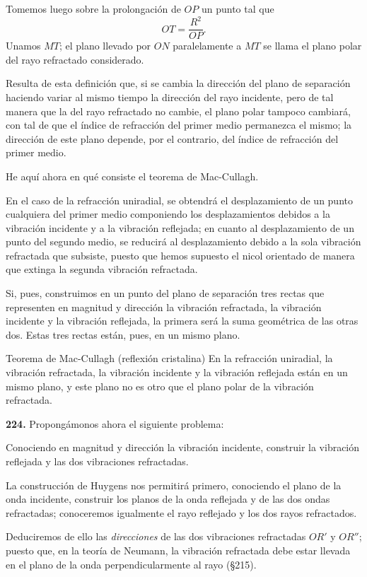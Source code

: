 Tomemos luego sobre la prolongación de $OP$ un punto tal que
\[
OT=\frac{R^2}{OP}.
\]
Unamos $MT$; el plano llevado por $ON$ paralelamente a $MT$ se llama el
plano polar del rayo refractado considerado.

Resulta de esta definición que, si se cambia la dirección del plano de
separación haciendo variar al mismo tiempo la dirección del rayo
incidente, pero de tal manera que la del rayo refractado no cambie, el
plano polar tampoco cambiará, con tal de que el índice de refracción del
primer medio permanezca el mismo; la dirección de este plano depende, por
el contrario, del índice de refracción del primer medio.

He aquí ahora en qué consiste el teorema de Mac-Cullagh.

En el caso de la refracción uniradial, se obtendrá el desplazamiento de
un punto cualquiera del primer medio componiendo los desplazamientos
debidos a la vibración incidente y a la vibración reflejada; en cuanto al
desplazamiento de un punto del segundo medio, se reducirá al
desplazamiento debido a la sola vibración refractada que subsiste, puesto
que hemos supuesto el nicol orientado de manera que extinga la segunda
vibración refractada.

Si, pues, construimos en un punto del plano de separación tres rectas que
representen en magnitud y dirección la vibración refractada, la vibración
incidente y la vibración reflejada, la primera será la suma geométrica
de las otras dos. Estas tres rectas están, pues, en un mismo plano.

\begin{enunciado}{Teorema de Mac-Cullagh (reflexión cristalina)}
En la refracción uniradial, la vibración refractada, la vibración
incidente y la vibración reflejada están en un mismo plano, y este plano
no es otro que el plano polar de la vibración refractada.
\end{enunciado}

\noindent\textbf{224.} Propongámonos ahora el siguiente problema:

Conociendo en magnitud y dirección la vibración incidente, construir la
vibración reflejada y las dos vibraciones refractadas.

La construcción de Huygens nos permitirá primero, conociendo el plano de
la onda incidente, construir los planos de la onda reflejada y de las dos
ondas refractadas; conoceremos igualmente el rayo reflejado y los dos
rayos refractados.

Deduciremos de ello las \emph{direcciones} de las dos vibraciones
refractadas $OR'$ y $OR''$; puesto que, en la teoría de Neumann, la
vibración refractada debe estar llevada en el plano de la onda
perpendicularmente al rayo (§215).

